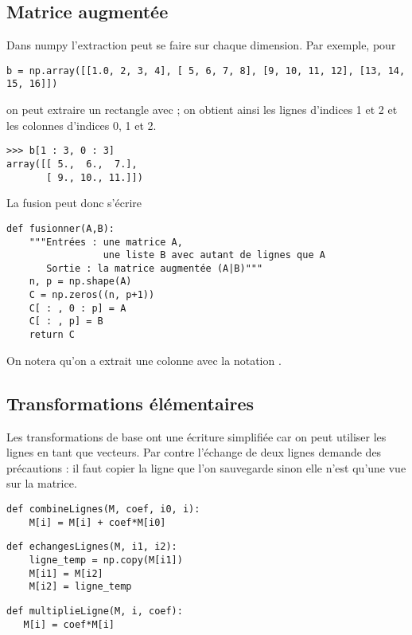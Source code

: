 \subsection{Matrice augmentée}
Dans {\sc numpy} l'extraction peut se faire sur chaque dimension. Par exemple, pour
\begin{lstlisting}
b = np.array([[1.0, 2, 3, 4], [ 5, 6, 7, 8], [9, 10, 11, 12], [13, 14, 15, 16]])
\end{lstlisting}
on peut extraire un rectangle avec  ; on obtient ainsi les lignes d'indices 1 et 2 et les colonnes d'indices 0, 1 et 2.
\begin{lstlisting}
>>> b[1 : 3, 0 : 3]
array([[ 5.,  6.,  7.],
       [ 9., 10., 11.]])
\end{lstlisting}
La fusion peut donc s'écrire
\begin{lstlisting}
def fusionner(A,B):
    """Entrées : une matrice A, 
                 une liste B avec autant de lignes que A
       Sortie : la matrice augmentée (A|B)"""
    n, p = np.shape(A)
    C = np.zeros((n, p+1))
    C[ : , 0 : p] = A
    C[ : , p] = B
    return C
\end{lstlisting}
On notera qu'on a extrait une colonne avec la notation .
\subsection{Transformations élémentaires}
Les transformations de base ont une écriture simplifiée car on peut utiliser les lignes en tant que vecteurs. Par contre l'échange de deux lignes demande des précautions : il faut copier la ligne que l'on sauvegarde sinon elle n'est qu'une vue sur la matrice.
\begin{lstlisting}
def combineLignes(M, coef, i0, i):
    M[i] = M[i] + coef*M[i0]
\end{lstlisting}
\begin{lstlisting}
def echangesLignes(M, i1, i2):
    ligne_temp = np.copy(M[i1])
    M[i1] = M[i2]
    M[i2] = ligne_temp
\end{lstlisting}
\begin{lstlisting}
def multiplieLigne(M, i, coef):
   M[i] = coef*M[i]
\end{lstlisting}
